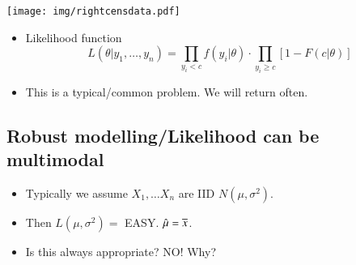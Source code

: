 \documentclass[11pt,english]{scrbook}
\begin{document}
\begin{center}
\begin{center}
\texttt{[image: img/rightcensdata.pdf]}
\end{center}

\end{center}

\begin{itemize}
\item Likelihood function
\[
  L(\theta | y_{1},\ldots,y_{n}) = \prod_{y_{i} < c} f(y_{i}|\theta)\cdot \prod_{y_{i}\geq c}\left[ 1 - F(c|\theta) \right]
  \]

\item This is a typical/common problem.  We will return often.
\end{itemize}

\subsection{Robust modelling/Likelihood can be multimodal}
\label{sec:orgd33756d}

\begin{itemize}
\item Typically we assume \(X_{1},\ldots X_{n}\) are IID \(N(\mu,\sigma^{2})\).

\item Then \(L(\mu,\sigma^{2}) =\) EASY.  \(\hat{\mu} = \overline{x}\).

\item Is this always appropriate?  NO!  Why?
\end{itemize}
\end{document}
